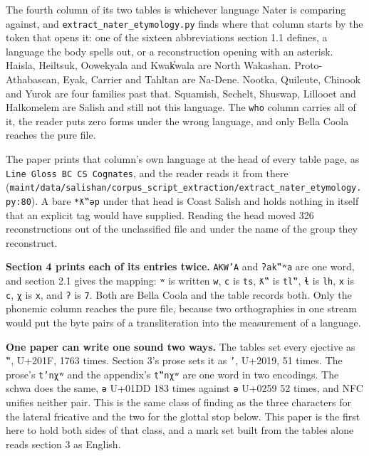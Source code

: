 The fourth column of its two tables is whichever language Nater is comparing against, and \texttt{extract\_\allowbreak{}nater\_\allowbreak{}etymology.\allowbreak{}py} finds where that column starts by the token that opens it: one of the sixteen abbreviations section 1.1 defines, a language the body spells out, or a reconstruction opening with an asterisk. Haisla, Heiltsuk, Oowekyala and Kwak̓wala are North Wakashan. Proto-Athabascan, Eyak, Carrier and Tahltan are Na-Dene. Nootka, Quileute, Chinook and Yurok are four families past that. Squamish, Sechelt, Shuswap, Lillooet and Halkomelem are Salish and still not this language. The \texttt{who} column carries all of it, the reader puts zero forms under the wrong language, and only Bella Coola reaches the pure file.

The paper prints that column's own language at the head of every table page, as \texttt{Line Gloss BC CS Cognates}, and the reader reads it from there (\texttt{maint/\allowbreak{}data/\allowbreak{}salishan/\allowbreak{}corpus\_\allowbreak{}script\_\allowbreak{}extraction/\allowbreak{}extract\_\allowbreak{}nater\_\allowbreak{}etymology.\allowbreak{}py:80}). A bare \texttt{*ƛ‟ǝp} under that head is Coast Salish and holds nothing in itself that an explicit tag would have supplied. Reading the head moved 326 reconstructions out of the unclassified file and under the name of the group they reconstruct.

\textbf{Section 4 prints each of its entries twice.} \texttt{AKW'A} and \texttt{ʔak‟ʷa} are one word, and section 2.1 gives the mapping: \texttt{ʷ} is written \texttt{w}, \texttt{c} is \texttt{ts}, \texttt{ƛ‟} is \texttt{tl‟}, \texttt{ɬ} is \texttt{lh}, \texttt{x} is \texttt{c}, \texttt{χ} is \texttt{x}, and \texttt{ʔ} is \texttt{7}. Both are Bella Coola and the table records both. Only the phonemic column reaches the pure file, because two orthographies in one stream would put the byte pairs of a transliteration into the measurement of a language.

\textbf{One paper can write one sound two ways.} The tables set every ejective as \texttt{‟}, U+201F, 1763 times. Section 3's prose sets it as \texttt{’}, U+2019, 51 times. The prose's \texttt{t’nχʷ} and the appendix's \texttt{t‟nχʷ} are one word in two encodings. The schwa does the same, \texttt{ǝ} U+01DD 183 times against \texttt{ə} U+0259 52 times, and NFC unifies neither pair. This is the same class of finding as the three characters for the lateral fricative and the two for the glottal stop below. This paper is the first here to hold both sides of that class, and a mark set built from the tables alone reads section 3 as English.

